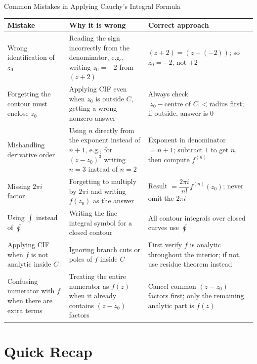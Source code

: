 \documentclass[12pt,a4paper]{article}
\begin{document}
\begin{mistakebox}{Common Mistakes in Applying Cauchy's Integral Formula}
\begin{center}
\begin{tabular}{p{5.0cm} p{5.0cm} p{5.0cm}}
\toprule
\textbf{Mistake} & \textbf{Why it is wrong} & \textbf{Correct approach} \\
\midrule
Wrong identification of $z_0$ & Reading the sign incorrectly from the denominator,
e.g., writing $z_0 = +2$ from $(z+2)$ &
$(z + 2) = (z - (-2))$; so $z_0 = -2$, not $+2$ \\[4pt]
Forgetting the contour must enclose $z_0$ &
Applying CIF even when $z_0$ is outside $C$, getting a wrong nonzero answer &
Always check $|z_0 - \text{centre of }C| < \text{radius}$ first; if outside, answer is $0$ \\[4pt]
Mishandling derivative order & Using $n$ directly from the exponent instead of $n+1$,
e.g., for $(z-z_0)^3$ writing $n = 3$ instead of $n = 2$ &
Exponent in denominator $= n+1$; subtract $1$ to get $n$, then compute $f^{(n)}$ \\[4pt]
Missing $2\pi i$ factor & Forgetting to multiply by $2\pi i$ and writing $f(z_0)$ as the answer &
Result $= \dfrac{2\pi i}{n!} f^{(n)}(z_0)$; never omit the $2\pi i$ \\[4pt]
Using $\int$ instead of $\oint$ & Writing the line integral symbol for a closed contour &
All contour integrals over closed curves use $\oint$ \\[4pt]
Applying CIF when $f$ is not analytic inside $C$ & Ignoring branch cuts or poles of $f$ inside $C$ &
First verify $f$ is analytic throughout the interior; if not, use residue theorem instead \\[4pt]
Confusing numerator with $f$ when there are extra terms & Treating the entire numerator as $f(z)$
when it already contains $(z - z_0)$ factors &
Cancel common $(z-z_0)$ factors first; only the remaining analytic part is $f(z)$ \\
\bottomrule
\end{tabular}
\end{center}
\end{mistakebox}

\section{Quick Recap}
\end{document}
